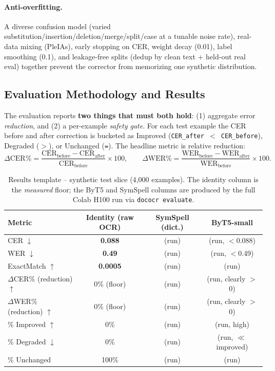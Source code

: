 \documentclass[12pt,a4paper]{article}
\begin{document}
\paragraph{Anti-overfitting.} A diverse confusion model (varied substitution/insertion/deletion/merge/split/case at a tunable noise rate), real-data mixing (PleIAs), early stopping on CER, weight decay (0.01), label smoothing (0.1), and leakage-free splits (dedup by clean text + held-out real eval) together prevent the corrector from memorizing one synthetic distribution.

\subsection{Evaluation Methodology and Results}

The evaluation reports \textbf{two things that must both hold}: (1) aggregate error \emph{reduction}, and (2) a per-example \emph{safety gate}. For each test example the CER before and after correction is bucketed as Improved (\texttt{CER\_after $<$ CER\_before}), Degraded (\texttt{$>$}), or Unchanged (\texttt{=}). The headline metric is relative reduction:
\[
\Delta\text{CER}\% = \frac{\text{CER}_{\text{before}} - \text{CER}_{\text{after}}}{\text{CER}_{\text{before}}}\times 100,
\qquad
\Delta\text{WER}\% = \frac{\text{WER}_{\text{before}} - \text{WER}_{\text{after}}}{\text{WER}_{\text{before}}}\times 100 .
\]

\begin{table}[H]
\centering
\caption{Results template -- synthetic test slice (4{,}000 examples). The identity column is the \emph{measured} floor; the ByT5 and SymSpell columns are produced by the full Colab H100 run via \texttt{dococr evaluate}.}
\small
\begin{tabular}{lccc}
\toprule
\textbf{Metric} & \textbf{Identity (raw OCR)} & \textbf{SymSpell (dict.)} & \textbf{ByT5-small} \\
\midrule
CER $\downarrow$               & \textbf{0.088} & (run) & (run, $<$0.088) \\
WER $\downarrow$               & \textbf{0.49}  & (run) & (run, $<$0.49) \\
ExactMatch $\uparrow$          & \textbf{0.0005} & (run) & (run) \\
$\Delta$CER\% (reduction) $\uparrow$ & 0\% (floor) & (run) & (run, clearly $>$0) \\
$\Delta$WER\% (reduction) $\uparrow$ & 0\% (floor) & (run) & (run, clearly $>$0) \\
\% Improved $\uparrow$          & 0\% & (run) & (run, high) \\
\% Degraded $\downarrow$        & 0\% & (run) & (run, $\ll$ improved) \\
\% Unchanged                   & 100\% & (run) & (run) \\
\bottomrule
\end{tabular}
\end{table}
\end{document}

